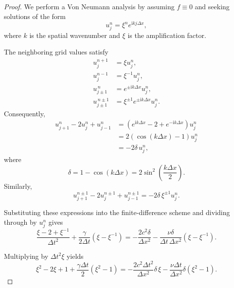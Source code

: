 \documentclass{Configuration_Files/PoliMi3i_thesis}
\begin{document}
\begin{proof}
We perform a Von Neumann analysis by assuming $f\equiv0$ and seeking solutions
of the form
\begin{equation*}
    u_j^n=\xi^n e^{\mathrm{i}kj\Delta x},
\end{equation*}
where $k$ is the spatial wavenumber and $\xi$ is the amplification factor.

The neighboring grid values satisfy
\begin{align*}
u_j^{n+1}&=\xi u_j^n,\\
u_j^{n-1}&=\xi^{-1}u_j^n,\\
u_{j\pm1}^{\,n}&=e^{\pm\mathrm{i}k\Delta x}u_j^n,\\
u_{j\pm1}^{\,n\pm1}&=\xi^{\pm1}e^{\pm\mathrm{i}k\Delta x}u_j^n.
\end{align*}
Consequently,
\begin{align*}
u_{j+1}^n-2u_j^n+u_{j-1}^n
&=
\left(e^{\mathrm{i}k\Delta x}-2+e^{-\mathrm{i}k\Delta x}\right)u_j^n\\
&=
2(\cos(k\Delta x)-1)u_j^n\\
&=
-2\delta\,u_j^n,
\end{align*}
where
\begin{equation*}
\delta
=
1-\cos(k\Delta x)
=
2\sin^2\!\left(\frac{k\Delta x}{2}\right).
\end{equation*}
Similarly,
\begin{equation*}
u_{j+1}^{n\pm1}
-2u_j^{n\pm1}
+u_{j-1}^{n\pm1}
=
-2\delta\,\xi^{\pm1}u_j^n.
\end{equation*}

Substituting these expressions into the finite-difference scheme and dividing
through by $u_j^n$ gives
\begin{equation*}
\frac{\xi-2+\xi^{-1}}{\Delta t^2}
+
\frac{\gamma}{2\Delta t}\left(\xi-\xi^{-1}\right)
=
-\frac{2c^2\delta}{\Delta x^2}
-
\frac{\nu\delta}{\Delta t\,\Delta x^2}
\left(\xi-\xi^{-1}\right).
\end{equation*}

Multiplying by $\Delta t^2\xi$ yields
\begin{equation*}
\xi^2-2\xi+1
+\frac{\gamma\Delta t}{2}\left(\xi^2-1\right)
=
-\frac{2c^2\Delta t^2}{\Delta x^2}\delta\,\xi
-
\frac{\nu\Delta t}{\Delta x^2}\delta
\left(\xi^2-1\right).
\end{equation*}


\end{proof}
\end{document}
